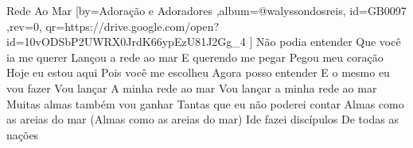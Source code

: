 \beginsong
{Rede Ao Mar %
}[by={Adoração e Adoradores %
},album={@walyssondosreis},
id={GB0097 %
},rev={0}, %
qr={https://drive.google.com/open?id=10vODSbP2UWRX0JrdK66ypEzU81J2Gg_4 %
}]
\beginverse*
Não podia entender
Que você ia me querer
Lançou a rede ao mar
E querendo me pegar
Pegou meu coração
\endverse
\beginverse*
Hoje eu estou aqui
Pois você me escolheu
Agora posso entender
E o mesmo eu vou fazer
Vou lançar
A minha rede ao mar
\endverse
\beginchorus
Vou lançar a minha rede ao mar
Muitas almas também vou ganhar
Tantas que eu não poderei contar
Almas como as areias do mar
(Almas como as areias do mar)
\endchorus
\beginverse*
Ide fazei discípulos
De todas as nações
\endverse

